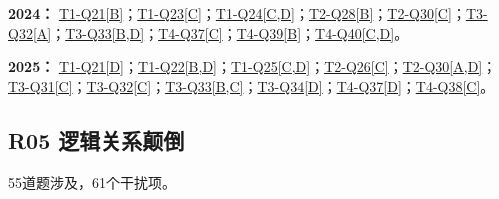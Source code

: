 \documentclass[11pt,a4paper]{article}
\begin{document}
\noindent\textbf{2024：} \hyperref[idx-2024-T1-Q21]{T1-Q21[B]}；\hyperref[idx-2024-T1-Q23]{T1-Q23[C]}；\hyperref[idx-2024-T1-Q24]{T1-Q24[C,D]}；\hyperref[idx-2024-T2-Q28]{T2-Q28[B]}；\hyperref[idx-2024-T2-Q30]{T2-Q30[C]}；\hyperref[idx-2024-T3-Q32]{T3-Q32[A]}；\hyperref[idx-2024-T3-Q33]{T3-Q33[B,D]}；\hyperref[idx-2024-T4-Q37]{T4-Q37[C]}；\hyperref[idx-2024-T4-Q39]{T4-Q39[B]}；\hyperref[idx-2024-T4-Q40]{T4-Q40[C,D]}。\par\smallskip
\noindent\textbf{2025：} \hyperref[idx-2025-T1-Q21]{T1-Q21[D]}；\hyperref[idx-2025-T1-Q22]{T1-Q22[B,D]}；\hyperref[idx-2025-T1-Q25]{T1-Q25[C,D]}；\hyperref[idx-2025-T2-Q26]{T2-Q26[C]}；\hyperref[idx-2025-T2-Q30]{T2-Q30[A,D]}；\hyperref[idx-2025-T3-Q31]{T3-Q31[C]}；\hyperref[idx-2025-T3-Q32]{T3-Q32[C]}；\hyperref[idx-2025-T3-Q33]{T3-Q33[B,C]}；\hyperref[idx-2025-T3-Q34]{T3-Q34[D]}；\hyperref[idx-2025-T4-Q37]{T4-Q37[D]}；\hyperref[idx-2025-T4-Q38]{T4-Q38[C]}。\par\smallskip
{}
\subsection{R05 逻辑关系颠倒}\label{class-R05}
55道题涉及，61个干扰项。
\end{document}
